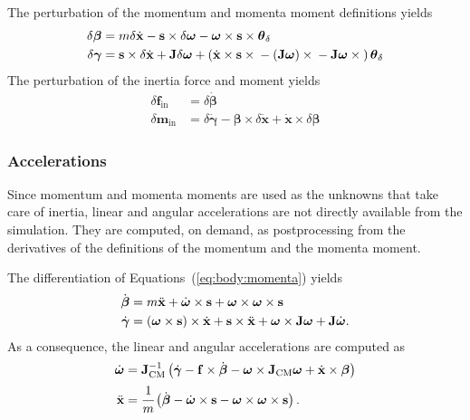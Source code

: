 \documentclass[10pt,dvips,fleqn,subeqn]{report}
\newcommand{\T}[1]{\bm{\mathbf{#1}}}
\newcommand{\TT}[1]{\bm{\mathbf{#1}}}
\begin{document}
The perturbation of the momentum and momenta moment definitions yields
\begin{subequations}
\begin{align}
	\delta\T{\beta}
	&= m \delta\dot{\T{x}}
	- \T{s}\times\delta\T{\omega}
	- \T{\omega}\times\T{s}\times\T{\theta}_{\delta} \\
	\delta\T{\gamma}
	&=
	\T{s}\times\delta\dot{\T{x}}
	+ \TT{J} \delta\T{\omega}
	+ \plbr{
		\dot{\T{x}}\times\T{s}\times{}
		- \plbr{\TT{J} \T{\omega}}\times{}
		- \TT{J} \T{\omega}\times{}
	}\T{\theta}_{\delta}
\end{align}
\end{subequations}
The perturbation of the inertia force and moment yields
\begin{subequations}
\begin{align}
	\delta\T{f}_{\text{in}}
	&= \delta\dot{\T{\beta}} \\
	\delta\T{m}_{\text{in}}
	&= \delta\dot{\T{\gamma}}
	- \T{\beta}\times\delta\dot{\T{x}}
	+ \dot{\T{x}}\times\delta\T{\beta}
\end{align}
\end{subequations}


\subsubsection{Accelerations}
\label{sec:nodes:structural nodes:dynamic structural nodes:accelerations}
Since momentum and momenta moments are used as the unknowns
that take care of inertia, linear and angular accelerations
are not directly available from the simulation.
They are computed, on demand, as postprocessing from the derivatives
of the definitions of the momentum and the momenta moment.

The differentiation of Equations~(\ref{eq:body:momenta}) yields
\begin{subequations}
\begin{align}
	\dot{\T{\beta}} &= m \ddot{\T{x}} + \dot{\T{\omega}} \times \T{s}
		+ \T{\omega} \times \T{\omega} \times \T{s} \\
	\dot{\T{\gamma}} &= \plbr{\T{\omega}\times \T{s}} \times \dot{\T{x}}
		+ \T{s} \times \ddot{\T{x}}
		+ \T{\omega} \times \TT{J} \T{\omega}
		+ \TT{J} \dot{\T{\omega}} .
\end{align}
\end{subequations}
As a consequence, the linear and angular accelerations are computed as
\begin{align}
	\dot{\T{\omega}}
	&= \TT{J}_{\text{CM}}^{-1} \plbr{
		\dot{\T{\gamma}}
		- \T{f} \times \dot{\T{\beta}}
		- \T{\omega} \times \TT{J}_{\text{CM}} \T{\omega}
		+ \dot{\T{x}} \times \T{\beta}
	} \\
	\ddot{\T{x}}
	&= \cfrac{1}{m}\plbr{
		\dot{\T{\beta}}
		- \dot{\T{\omega}} \times \T{s}
		- \T{\omega} \times \T{\omega} \times \T{s}
	} .
\end{align}
\end{document}
